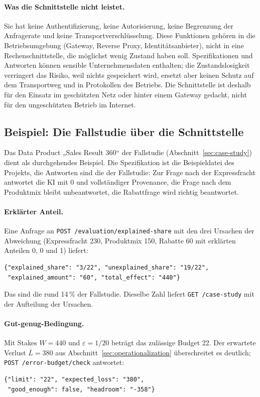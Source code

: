 \documentclass[a4paper,12pt]{article}
\theoremstyle{definition}
\begin{document}
\paragraph{Was die Schnittstelle nicht leistet.}
Sie hat keine Authentifizierung, keine Autorisierung, keine Begrenzung der Anfragerate und keine Transportverschlüsselung. Diese Funktionen gehören in die Betriebsumgebung (Gateway, Reverse Proxy, Identitätsanbieter), nicht in eine Rechenschnittstelle, die möglichst wenig Zustand haben soll. Spezifikationen und Antworten können sensible Unternehmensdaten enthalten; die Zustandslosigkeit verringert das Risiko, weil nichts gespeichert wird, ersetzt aber keinen Schutz auf dem Transportweg und in Protokollen des Betriebs. Die Schnittstelle ist deshalb für den Einsatz im geschützten Netz oder hinter einem Gateway gedacht, nicht für den ungeschützten Betrieb im Internet.

\subsection{Beispiel: Die Fallstudie über die Schnittstelle}
\label{sec:api-example}
Das Data Product „Sales Result 360“ der Fallstudie (Abschnitt~\ref{sec:case-study}) dient als durchgehendes Beispiel. Die Spezifikation ist die Beispieldatei des Projekts, die Antworten sind die der Fallstudie: Zur Frage nach der Expressfracht antwortet die KI mit 0 und vollständiger Provenance, die Frage nach dem Produktmix bleibt unbeantwortet, die Rabattfrage wird richtig beantwortet.

\paragraph{Erklärter Anteil.}
Eine Anfrage an \texttt{POST /evaluation/explained-share} mit den drei Ursachen der Abweichung (Expressfracht 230, Produktmix 150, Rabatte 60 mit erklärten Anteilen 0, 0 und 1) liefert:
\begin{lstlisting}
{"explained_share": "3/22", "unexplained_share": "19/22",
 "explained_amount": "60", "total_effect": "440"}
\end{lstlisting}
Das sind die rund 14\,\% der Fallstudie. Dieselbe Zahl liefert \texttt{GET /case-study} mit der Aufteilung der Ursachen.

\paragraph{Gut-genug-Bedingung.}
Mit Stakes $W=440$ und $\varepsilon=1/20$ beträgt das zulässige Budget 22. Der erwartete Verlust $\bar L=380$ aus Abschnitt~\ref{sec:operationalization} überschreitet es deutlich; \texttt{POST /error-budget/check} antwortet:
\begin{lstlisting}
{"limit": "22", "expected_loss": "380",
 "good_enough": false, "headroom": "-358"}
\end{lstlisting}
\end{document}
